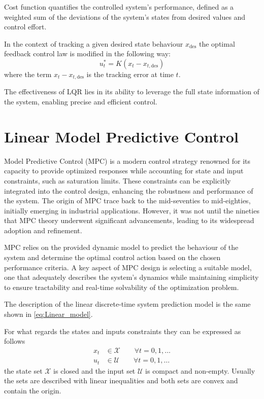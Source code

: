 \documentclass[a4paper,12pt,oneside]{book}
\begin{document}
Cost function quantifies the controlled system's performance, defined as a weighted sum of the deviations of the system's states from desired values and control effort.

In the context of tracking a given desired state behaviour $x_{\text{des}}$ the optimal feedback control law is modified in the following way:
\begin{equation}
    u_t^* = K (x_t - x_{t,\text{des}})
\label{Closed-loop_control_law}
\end{equation}
where the term $x_t - x_{t,\text{des}}$ is the tracking error at time $t$.

The effectiveness of LQR lies in its ability to leverage the full state information of the system, enabling precise and efficient control.


\section{Linear Model Predictive Control}
Model Predictive Control (MPC) is a modern control strategy renowned for its capacity to provide optimized responses while accounting for state and input constraints, such as saturation limits.
These constraints can be explicitly integrated into the control design, enhancing the robustness and performance of the system. 
The origin of MPC trace back to the mid-seventies to mid-eighties, initially emerging in industrial applications. 
However, it was not until the nineties that MPC theory underwent significant advancements, leading to its widespread adoption and refinement.

\bigskip
MPC relies on the provided dynamic model to predict the behaviour of the system and determine the optimal control action based on the chosen performance criteria. 
A key aspect of MPC design is selecting a suitable model, one that adequately describes the system's dynamics while maintaining simplicity to ensure tractability and real-time solvability of the optimization problem.

\bigskip
The description of the linear discrete-time system prediction model is the same shown in \eqref{eq:Linear_model}.

For what regards the states and inputs constraints they can be expressed as follows
\begin{align}
    x_t & \in \mathcal{X} \quad \quad \forall t = 0,1, \ldots \\
    u_t & \in \mathcal{U} \quad \quad \forall t = 0,1, \ldots
\end{align}
the state set $\mathcal{X}$ is closed and the input set $\mathcal{U}$ is compact and non-empty. Usually the sets are described with linear inequalities and both sets are convex and contain the origin.
\end{document}
